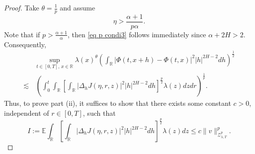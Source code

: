 \documentclass[11pt,reqno]{amsart}
\numberwithin{equation}{section}
\newcommand{\1}{{\bf 1}}
\newcommand{\2}{{\bf 2}}
\begin{document}
\begin{proof}
Take $\theta=\frac1p$  and assume   
   \begin{equation}\label{eq p condi4}
   \eta>\frac{\alpha+1}{p\alpha}.
   \end{equation}
Note that if  $p>\frac{\alpha+1}{\alpha}$,  then \eqref{eq p condi3} follows immediately since $\alpha+2H>2$.  Consequently, 
\begin{align*}
& \sup_{{t\in[0,T],\,x\in\mathbb R}} \lambda(x)^{\theta}\left(\int_{\mathbb{R}}\left|\Phi(t,x+h)-\Phi(t,x)\right|^2|h|^{2H-2}dh\right)^{\frac12}\\
 \lesssim &\,  \left( \int_0^t\int_{\mathbb{R}}\left[\int_{\mathbb{R}}|\Delta_{h}J(\eta,r,z)|^2|h|^{2H-2}dh\right]^{\frac{p}2}\lambda(z)dzdr \right)^{\frac1p}.
\end{align*}
 Thus, to prove part (ii), it suffices to show that   there exists some constant $c>0$, independent of $r\in[0,T]$, such that
 \begin{equation}\label{eq 4.21}
 I:=\mathbb{E}\int_{\mathbb{R}}\left[\int_{\mathbb{R}}|\Delta_{h}J(\eta,r,z)|^2|h|^{2H-2}dh\right]^{\frac{p}2}\lambda(z)dz\le c\|v\|_{\mathcal{Z}_{\lambda,T}^p}^p.
 \end{equation}
 

\end{proof}
\end{document}
